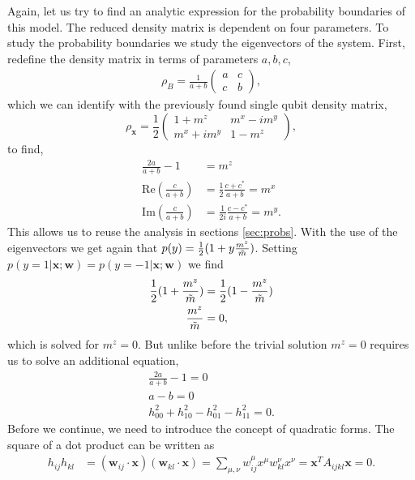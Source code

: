 \noindent Again, let us try to find an analytic expression for the probability boundaries of this model. The reduced density matrix is dependent on four parameters. To study the probability boundaries we study the eigenvectors of the system. First, redefine the density matrix in terms of parameters $a,b,c$,
\begin{align}
    \rho_B = \frac{1}{a+b}\begin{pmatrix}
    a & c\\
    c & b\end{pmatrix} \label{eq:rho_abc},
\end{align}
which we can identify with the previously found single qubit density matrix,
\begin{equation*}
        \rho_\mathbf{x} = \frac{1}{2}\begin{pmatrix}
           1 + m^z  & m^x - im^y\\
           m^x + im^y      & 1 - m^z          
        \end{pmatrix},
\end{equation*}
to find, 
\begin{align*}
    \frac{2a}{a+b} -1 &= m^z\\
    \text{Re}(\frac{c}{a+b}) &= \frac{1}{2}\frac{c + c^*}{a+b} = m^x\\
    \text{Im}(\frac{c}{a+b}) &= \frac{1}{2i}\frac{c - c^*}{a+b} = m^y.
\end{align*}
This allows us to reuse the analysis in sections \ref{sec:probs}. With the use of the eigenvectors we get again that $p(y) = \frac{1}{2}(1 + y\frac{m^z}{\Tilde{m}})$. Setting $p(y=1|\mathbf{x};\mathbf{w}) = p(y=-1|\mathbf{x};\mathbf{w})$ we find
\begin{align}
    \frac{1}{2}(1 + \frac{m^z}{\Tilde{m}}) &= \frac{1}{2}(1 - \frac{m^z}{\Tilde{m}})\nonumber\\
    \frac{m^z}{\Tilde{m}} &= 0,
\end{align}
which is solved for $m^z=0$. But unlike before the trivial solution $m^z=0$ requires us to solve an additional equation,
\begin{align}
    \frac{2a}{a+b} -1 = 0\nonumber\\
    a - b = 0\nonumber\\
    h_{00}^2 + h_{10}^2 - h_{01}^2 - h_{11}^2 = 0 \label{eq:boundary_ent}.
\end{align}
Before we continue, we need to introduce the concept of quadratic forms. The square of a dot product can be written as
\begin{align*}
    h_{ij} h_{kl} &= (\mathbf{w}_{ij} \cdot \mathbf{x}) (\mathbf{w}_{kl} \cdot \mathbf{x}) =\sum_{\mu, \nu} w_{ij}^\mu x^\mu w_{kl}^\nu x^\nu = \mathbf{x}^TA_{ijkl}\mathbf{x} = 0.
\end{align*}
